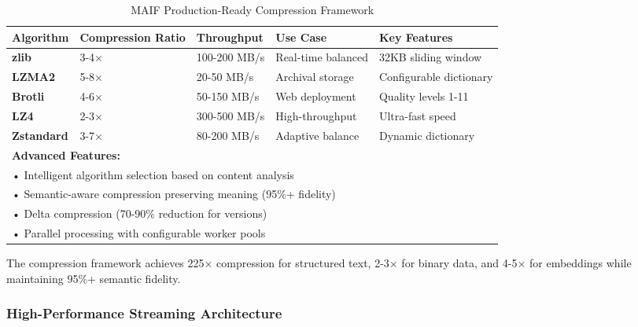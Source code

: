 \documentclass[conference]{IEEEtran}
\begin{document}
\begin{table*}[!t]
\renewcommand{\arraystretch}{1.3}
\caption{MAIF Production-Ready Compression Framework}
\label{tab:compression-framework}
\centering
\footnotesize
\begin{tabular}{p{2.5cm}p{3cm}p{2.5cm}p{2.5cm}p{3cm}}
\toprule
\textbf{Algorithm} & \textbf{Compression Ratio} & \textbf{Throughput} & \textbf{Use Case} & \textbf{Key Features} \\
\midrule
\textbf{zlib} & 3-4× & 100-200 MB/s & Real-time balanced & 32KB sliding window \\
\textbf{LZMA2} & 5-8× & 20-50 MB/s & Archival storage & Configurable dictionary \\
\textbf{Brotli} & 4-6× & 50-150 MB/s & Web deployment & Quality levels 1-11 \\
\textbf{LZ4} & 2-3× & 300-500 MB/s & High-throughput & Ultra-fast speed \\
\textbf{Zstandard} & 3-7× & 80-200 MB/s & Adaptive balance & Dynamic dictionary \\
\midrule
\multicolumn{5}{l}{\textbf{Advanced Features:}} \\
\multicolumn{5}{l}{• Intelligent algorithm selection based on content analysis} \\
\multicolumn{5}{l}{• Semantic-aware compression preserving meaning (95\%+ fidelity)} \\
\multicolumn{5}{l}{• Delta compression (70-90\% reduction for versions)} \\
\multicolumn{5}{l}{• Parallel processing with configurable worker pools} \\
\bottomrule
\end{tabular}
\end{table*}

The compression framework achieves 225× compression for structured text, 2-3× for binary data, and 4-5× for embeddings while maintaining 95\%+ semantic fidelity.

\subsubsection{High-Performance Streaming Architecture}
\end{document}
